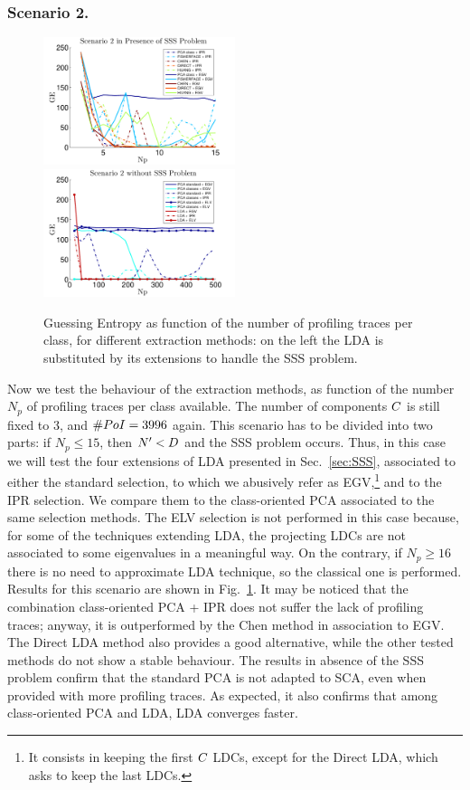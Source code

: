 \subsubsection{Scenario 2.}
\begin{figure}
\includegraphics[width=0.5\textwidth]{figures/Criterion2SSS.pdf}
\includegraphics[width=0.5\textwidth]{figures/Criterion2notSSS.pdf} 
\caption{Guessing Entropy as function of the number of profiling traces per class, for different extraction methods: on the left the LDA is substituted by its extensions to handle the SSS problem.}\label{fig:2}
\end{figure}
Now we test the behaviour of the extraction methods, as function of the number $N_p$ of profiling traces per class available. The number of components $\newTraceLength$ is still fixed to 3, and $\numPoI=3996$ again. This scenario has to be divided into two parts: if $N_p\leq 15$, then $\numTraces[]'<\traceLength$ and the SSS problem occurs. Thus, in this case we will test the four extensions of LDA presented in Sec.~\ref{sec:SSS}, associated to either the standard selection, to which we abusively refer as EGV,\footnote{It consists in keeping the first $\newTraceLength$ LDCs, except for the Direct LDA, which asks to keep the last LDCs.} and to the IPR selection.  We compare them to the class-oriented PCA associated to the same selection methods. The ELV selection is not performed in this case because, for some of the techniques extending LDA, the projecting LDCs are not associated to some eigenvalues in a meaningful way. On the contrary, if $N_p\geq 16$ there is no need to approximate LDA technique, so the classical one is performed. Results for this scenario are shown in Fig.~\ref{fig:2}. It may be noticed that the combination class-oriented PCA + IPR does not suffer the lack of profiling traces; anyway, it is outperformed by the Chen method in association to EGV. The Direct LDA method also provides a good alternative, while the other tested methods do not show a stable behaviour. The results in absence of the SSS problem confirm that the standard PCA is not adapted to SCA, even when provided with more profiling traces. As expected, it also confirms that among class-oriented PCA and LDA, LDA converges faster.



